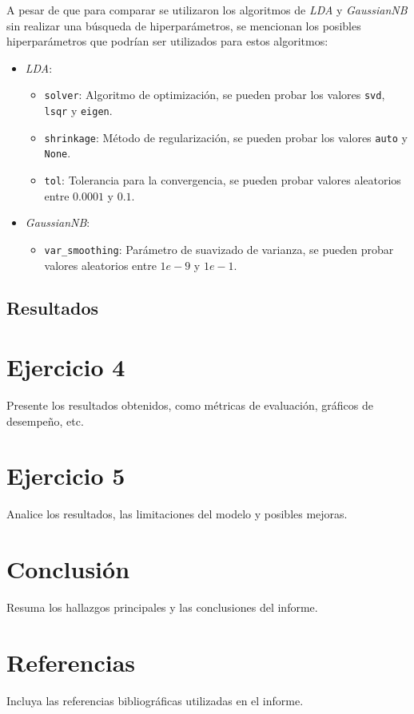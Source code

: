 \documentclass[12pt,a4paper]{article}
\begin{document}
A pesar de que para comparar se utilizaron los algoritmos de \textit{LDA} y \textit{GaussianNB} sin realizar una búsqueda de hiperparámetros, se mencionan los posibles hiperparámetros
que podrían ser utilizados para estos algoritmos:
\begin{itemize}
    \item \textsl{LDA}:
    \begin{itemize}
        \item \texttt{solver}: Algoritmo de optimización, se pueden probar los valores \texttt{svd}, \texttt{lsqr} y \texttt{eigen}.
        \item \texttt{shrinkage}: Método de regularización, se pueden probar los valores \texttt{auto} y \texttt{None}.
        \item \texttt{tol}: Tolerancia para la convergencia, se pueden probar valores aleatorios entre $0.0001$ y $0.1$.
    \end{itemize}
    \item \textsl{GaussianNB}:
    \begin{itemize}
        \item \texttt{var\_smoothing}: Parámetro de suavizado de varianza, se pueden probar valores aleatorios entre $1e-9$ y $1e-1$.
    \end{itemize}
\end{itemize}

\subsection{Resultados}

 \section{Ejercicio 4}
Presente los resultados obtenidos, como métricas de evaluación, gráficos de desempeño, etc.

\section{Ejercicio 5}
Analice los resultados, las limitaciones del modelo y posibles mejoras.

\section{Conclusión}
Resuma los hallazgos principales y las conclusiones del informe.

\section*{Referencias}
Incluya las referencias bibliográficas utilizadas en el informe.
\end{document}
